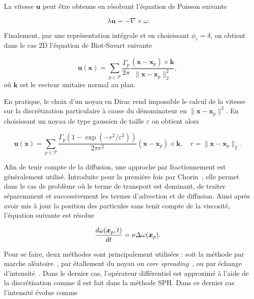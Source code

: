 La vitesse $\bm u$ peut être obtenue en résolvant l'équation de Poisson suivante

\begin{equation*}~\label{eq:poisson}
    \lambda \bm u = - \nabla \times \omega.
\end{equation*}

Finalement, par une représentation intégrale et en choisissant $\phi_\varepsilon = \delta$, on obtient dans le cas 2D l'équation de Biot-Savart suivante

\begin{equation*}
    \bm u(\bm x) = \sum_{p \in \mathcal P} \frac{\Gamma_p}{2\pi} \frac{(\bm x - \bm x_p)\times \bm k}{\|\bm x - \bm x_p\|_2^2},
\end{equation*}où $\bm k$ est le vecteur unitaire normal au plan.

En pratique, le choix d'un noyau en Dirac rend impossible le calcul de la vitesse sur la discrétization particulaire à cause du dénominateur en ${\|\bm x - \bm x_p\|^2}$. En choisissant un noyau de type gaussien de taille $\varepsilon$ on obtient alors

\begin{equation*}
    \bm u(\bm x) = \sum_{p \in \mathcal P} \frac{\Gamma_p(1 - \exp(-r^2 / \varepsilon^2)) }{2\pi r^2} (\bm x - \bm x_p)\times \bm k, \quad r = \|\bm x - \bm x_p\|_2.
\end{equation*}

Afin de tenir compte de la diffusion, une approche par fractionnement est généralement utilisé. Introduite pour la première fois par Chorin~\cite{chorin_discretization_1973}, elle permet dans le cas de problème où le terme de transport est dominant, de traiter séparemment et successivement les termes d'advection et de diffusion. Ainsi après avoir mis à jour la position des particules sans tenir compte de la viscosité, l'équation suivante est résolue

\begin{equation*}
    \frac{d\omega(\bm x_p, t)}{dt} = \nu \Delta \omega(\bm{x}_p).
\end{equation*}

Pour se faire, deux méthodes sont principalement utilisées : soit la méthode par marche aléatoire~\cite{chorin_discretization_1973}, par étallement du noyau ou \textit{core spreading}~\cite{LEONARD1980289}, ou par échange d'intensité~\cite{1989MaCom..53..485D}. Dans le dernier cas, l'opérateur différentiel est approximé à l'aide de la discrétisation comme il est fait dans la méthode SPH. Dans ce dernier cas l'intensité évolue comme


